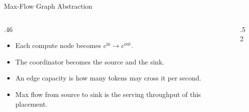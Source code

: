 
\begin{frame}[t,label=mm_hx_maxflow_01]{Max-Flow Graph Abstraction}

  \par
  \vspace{.02cm}
  \begin{columns}[c,onlytextwidth]
    \begin{column}{.46\textwidth}
      {\footnotesize\begin{itemize}\setlength{\itemsep}{.08cm}
        \item Each compute node becomes \(c^{\mathrm{in}}\rightarrow c^{\mathrm{out}}\).
        \item The coordinator becomes the source and the sink.
        \item An edge capacity is how many tokens may cross it per second.
        \item Max flow from source to sink is the serving throughput of this placement.
      \end{itemize}}
      \vspace{.08cm}
    \end{column}
    \begin{column}{.52\textwidth}
      {\centering{}\par}
    \end{column}
  \end{columns}
\end{frame}

